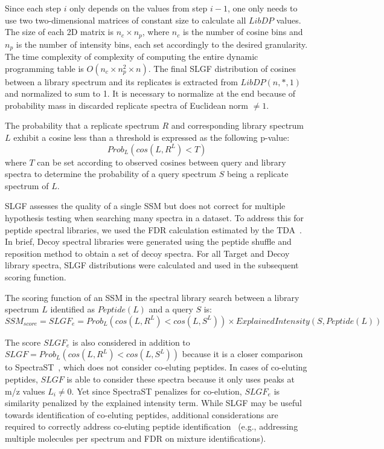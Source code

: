 \documentclass[endnotes,11pt]{article}
\begin{document}
Since each step $i$ only depends on the values from step $i-1$, one only needs to use two two-dimensional matrices of constant size to calculate all $LibDP$ values. The size of each 2D matrix is $n_c \times n_p$, where $n_c$ is the number of cosine bins and $n_p$ is the number of intensity bins, each set accordingly to the desired granularity. The time complexity of complexity of computing the entire dynamic programming table is $O(n_c \times n_p^2 \times n)$. The final SLGF distribution of cosines between a library spectrum and its replicates is extracted from $LibDP(n, *, 1)$ and normalized to sum to 1. It is necessary to normalize at the end because of probability mass in discarded replicate spectra of Euclidean norm $\neq 1$.

The probability that a replicate spectrum $R$ and corresponding library spectrum $L$ exhibit a cosine less than a threshold is expressed as the following p-value:
$$
Prob_L ( cos(L, R^L) < T  )
$$
where $T$ can be set according to observed cosines between query and library spectra to determine the probability of a query spectrum $S$ being a replicate spectrum of $L$.


SLGF assesses the quality of a single SSM but does not correct for multiple hypothesis testing when searching many spectra in a dataset. To address this for peptide spectral libraries, we used the FDR calculation estimated by the TDA~\cite{lam10}. In brief, Decoy spectral libraries were generated using the peptide shuffle and reposition method to obtain a set of decoy spectra. For all Target and Decoy library spectra, SLGF distributions were calculated and used in the subsequent scoring function.


The scoring function of an SSM in the spectral library search between a library spectrum $L$ identified as $Peptide(L)$ and a query $S$ is:
$$
SSM_{score} = SLGF_e = Prob_L ( cos(L, R^L) < cos (L, S^L)  ) \times
			Explained Intensity (S, Peptide(L))
$$

The score $SLGF_e$ is also considered in addition to
$SLGF = Prob_L ( cos(L, R^L) < cos (L, S^L)  )$
because it is a closer comparison to SpectraST~\cite{lam07}, which does not consider co-eluting peptides. In cases of co-eluting peptides, $SLGF$ is able to consider these spectra because it only uses peaks at m/z values $L_i\neq 0$. Yet since SpectraST penalizes for co-elution, $SLGF_e$ is similarity penalized by the explained intensity term. While SLGF may be useful towards identification of co-eluting peptides, additional considerations are required to correctly address co-eluting peptide identification~\cite{wang10} (e.g., addressing multiple molecules per spectrum and FDR on mixture identifications).
\end{document}
